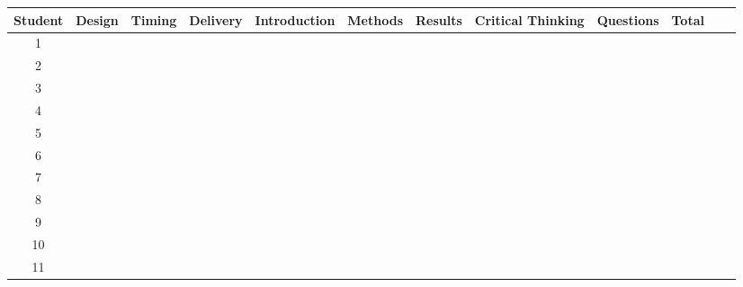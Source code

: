 \documentclass[a4paper]{article}
\begin{document}
\begin{center}
\begin{longtable}{|c|c|c|c|c|c|c|c|c|c|c|c|}
\hline
\textbf{Student} & \textbf{Design} & \textbf{Timing} & \textbf{Delivery} & \textbf{Introduction} & \textbf{Methods} & \textbf{Results} & \textbf{Critical Thinking} & \textbf{Questions} & \textbf{Total} \\
\hline
1 &  &  &  &  &  &  &  &  &  \\
\hline
2 &  &  &  &  &  &  &  &  &  \\
\hline
3 &  &  &  &  &  &  &  &  &  \\
\hline
4 &  &  &  &  &  &  &  &  &  \\
\hline
5 &  &  &  &  &  &  &  &  &  \\
\hline
6 &  &  &  &  &  &  &  &  &  \\
\hline
7 &  &  &  &  &  &  &  &  &  \\
\hline
8 &  &  &  &  &  &  &  &  &  \\
\hline
9 &  &  &  &  &  &  &  &  &  \\
\hline
10 &  &  &  &  &  &  &  &  &  \\
\hline
11 &  &  &  &  &  &  &  &  &  \\
\hline
\end{longtable}
\end{center}
\end{document}
